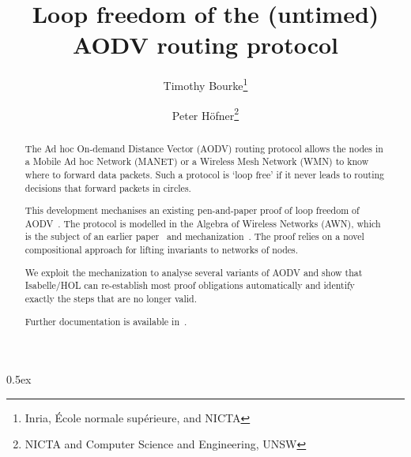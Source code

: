 \documentclass[11pt,a4paper]{article}
\begin{document}
\title{Loop freedom of the (untimed) AODV routing protocol}
\author{Timothy Bourke\thanks{Inria,
                              \'Ecole normale sup\'erieure,
                              and NICTA}
        \and
        Peter H\"ofner\thanks{NICTA
                              and Computer Science and Engineering, UNSW}}
\maketitle

\begin{abstract}
The Ad hoc On-demand Distance Vector (AODV) routing protocol allows the 
nodes in a Mobile Ad hoc Network (MANET) or a Wireless Mesh Network (WMN) to 
know where to forward data packets. Such a protocol is `loop free' if it 
never leads to routing decisions that forward packets in circles.

This development mechanises an existing pen-and-paper proof of loop freedom 
of AODV~\cite{FehnkerEtAl:AWN:2013}.
The protocol is modelled in the Algebra of Wireless Networks (AWN),
which is the subject of an earlier paper~\cite{BourkeEtAl:MechAWN:2014} and 
mechanization~\cite{Bourke14}.
The proof relies on a novel compositional approach for lifting invariants to 
networks of nodes.

We exploit the mechanization to analyse several variants of AODV and show 
that Isabelle/HOL can re-establish most proof obligations automatically and 
identify exactly the steps that are no longer valid.

Further documentation is available in~\cite{BourkevGlHof:ATVA:2014}.

\end{abstract}

\tableofcontents

\parindent 0pt\parskip 0.5ex

\newpage




\end{document}
